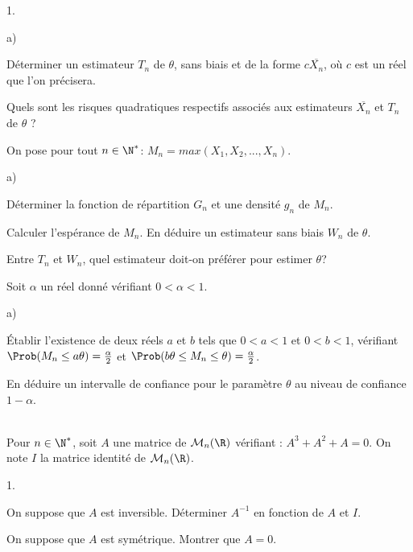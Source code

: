 \documentclass[11pt]{article}%
\begin{document}
\begin{exerciceAP}
\begin{noliste}{1.}
\begin{noliste}{a)}
    \setlength{\itemsep}{2mm}
    \item Déterminer un estimateur $T_n$ de $\theta$, sans biais et de
      la forme $c \overline{X_n}$, où $c$ est un réel que l'on
      précisera.
    \item Quels sont les risques quadratiques respectifs associés aux
      estimateurs $\overline{X_n}$ et $T_n$ de $\theta$ ?
    \end{noliste}
  \item On pose pour tout $n \in \N^*$: $M_n=max(X_1, X_2, ..., X_n)$.
    \begin{noliste}{a)}
    \setlength{\itemsep}{2mm}
    \item Déterminer la fonction de répartition $G_n$ et une densité
      $g_n$ de $M_n$.
    \item Calculer l'espérance de $M_n$. En déduire un estimateur sans
      biais $W_n$ de $\theta$. 
    \item Entre $T_n$ et $W_n$, quel estimateur doit-on préférer pour
      estimer $\theta$?  
    \end{noliste}
  \item Soit $\alpha$ un réel donné vérifiant $0 < \alpha < 1$. 
    \begin{noliste}{a)}
    \setlength{\itemsep}{2mm}
    \item Établir l'existence de deux réels $a$ et $b$ tels que $0 < a
      < 1$ et $0 < b < 1$, vérifiant $\Prob(M_n \leq a \theta)=
      \frac{\alpha}{2}$ et $\Prob(b  \theta  \leq M_n \leq \theta)=
      \frac{\alpha}{2}$. 
    \item En déduire un intervalle de confiance pour le paramètre
      $\theta$ au niveau de confiance $1-\alpha$.
    \end{noliste}
  \end{noliste}



\end{exerciceAP}


\begin{exerciceSP}~\\
  Pour $n \in \N^*$, soit $A$ une matrice de $\mathcal{M}_n(\R)$
  vérifiant : $A^3+A^2+A=0$. On note $I$ la matrice identité de
  $\mathcal{M}_n(\R)$.
  \begin{noliste}{1.}
    \setlength{\itemsep}{2mm}
  \item On suppose que $A$ est inversible. Déterminer $A^{-1}$ en
    fonction de $A$ et $I$.
  \item On suppose que $A$ est symétrique. Montrer que $A=0$.
  \end{noliste}
\end{exerciceSP}
\end{document}
